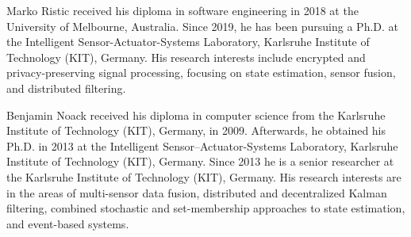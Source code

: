 \documentclass[10pt,letterpaper,oneside,twocolumn,journal]{IEEEtran}
\theoremstyle{definition}
\theoremstyle{definition}
\theoremstyle{remark}
\begin{document}
\ifCLASSOPTIONcaptionsoff
  \newpage
\fi





% 
%                                         
%                                         
%                                         
% 
\vspace{-\baselineskip}
\begin{IEEEbiography}{Marko Ristic}
received his diploma in software engineering in 2018 at the University of Melbourne, Australia. Since 2019, he has been pursuing a Ph.D. at the Intelligent Sensor-Actuator-Systems Laboratory, Karlsruhe Institute of Technology (KIT), Germany. His research interests include encrypted and privacy-preserving signal processing, focusing on state estimation, sensor fusion, and distributed filtering.
\end{IEEEbiography}

\begin{IEEEbiography}{Benjamin Noack}
received his diploma in computer science from the Karlsruhe Institute of Technology (KIT), Germany, in 2009. Afterwards, he obtained his Ph.D. in 2013 at the Intelligent Sensor–Actuator-Systems Laboratory, Karlsruhe Institute of Technology (KIT), Germany. Since 2013 he is a senior researcher at the Karlsruhe Institute of Technology (KIT), Germany. His research interests are in the areas of multi-sensor data fusion, distributed and decentralized Kalman filtering, combined stochastic and set-membership approaches to state estimation, and event-based systems.
\end{IEEEbiography}
\end{document}
